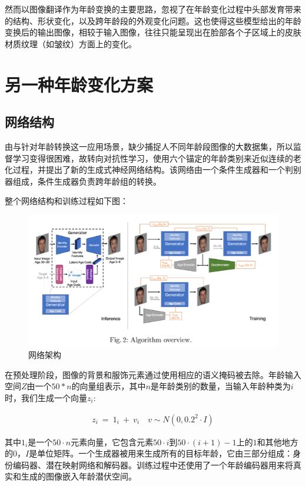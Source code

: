 \documentclass[12pt,a4paper]{article}
\begin{document}
然而以图像翻译作为年龄变换的主要思路，忽视了在年龄变化过程中头部发育带来的结构、形状变化，以及跨年龄段的外观变化问题。这也使得这些模型给出的年龄变换后的输出图像，相较于输入图像，往往只能呈现出在脸部各个子区域上的皮肤材质纹理（如皱纹）方面上的变化。


\section{另一种年龄变化方案}

\subsection{网络结构}
由与针对年龄转换这一应用场景，缺少捕捉人不同年龄段图像的大数据集，所以监督学习变得很困难，故转向对抗性学习，使用六个锚定的年龄类别来近似连续的老化过程，并提出了新的生成式神经网络结构。该网络由一个条件生成器和一个判别器组成，条件生成器负责跨年龄组的转换。


整个网络结构和训练过程如下图：


\begin{figure}[H]
	\centering
	\includegraphics[scale=0.7]{assets/layer_structure.png}
	\caption{网络架构}
\end{figure}


在预处理阶段，图像的背景和服饰元素通过使用相应的语义掩码被去除。年龄输入空间$Z$由一个$50*n$的向量组表示，其中$n$是年龄类别的数量，当输入年龄种类为$i$时，我们生成一个向量$z_i$:

\begin{align*}
	z_i\ =\ 1_i\ +\ v_i \quad v \sim N(0, 0.2^2 \cdot I)
\end{align*}

其中$1_i$是一个$50·n$元素向量，它包含元素$50·i$到$50·(i+1)-1$上的$1$和其他地方的$0$，$I$是单位矩阵。一个生成器被用来生成所有的目标年龄，它由三部分组成：身份编码器、潜在映射网络和解码器。训练过程中还使用了一个年龄编码器用来将真实和生成的图像嵌入年龄潜伏空间。
\end{document}
